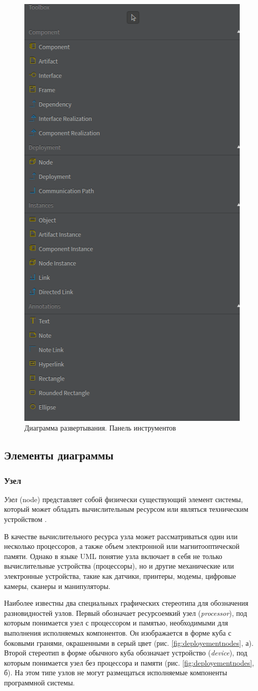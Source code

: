 \documentclass[a4paper,12pt]{extreport}
\begin{document}
\begin{figure}[h!]
	\centering
	\includegraphics[width=0.3\linewidth]{images/toolboxdeployement}
	\caption{Диаграмма развертывания. Панель инструментов}
	\label{fig:toolboxdeployement}
\end{figure}


\subsection*{Элементы диаграммы}
\subsubsection*{Узел}
\textit{Узел} (node) представляет собой физически существующий элемент системы, который может обладать вычислительным ресурсом или являться техническим устройством .

В качестве вычислительного ресурса узла может рассматриваться один или несколько процессоров, а также объем электронной или магнитооптической памяти. Однако в языке UML понятие узла включает в себя не только вычислительные устройства (процессоры), но и другие механические или электронные устройства, такие как датчики, принтеры, модемы, цифровые камеры, сканеры и манипуляторы.

Наиболее известны два специальных графических стереотипа для обозначения разновидностей узлов. Первый обозначает ресурсоемкий узел (\textit{processor}), под которым понимается узел с процессором и памятью, необходимыми для выполнения исполняемых компонентов. Он изображается в форме куба с боковыми гранями, окрашенными в серый цвет (рис. \ref{fig:deployementnodes}, а). Второй стереотип в форме обычного куба обозначает устройство (\textit{device}), под которым понимается узел без процессора и памяти (рис. \ref{fig:deployementnodes}, б). На этом типе узлов не могут размещаться исполняемые компоненты программной системы.
\end{document}
